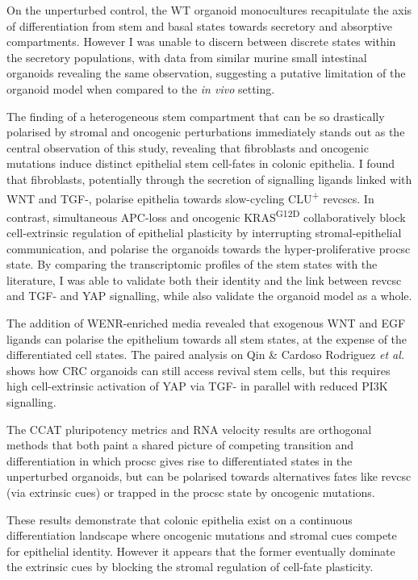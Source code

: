On the unperturbed control, the WT organoid monocultures recapitulate the axis of differentiation from stem and basal states towards secretory and absorptive compartments. However I was unable to discern between discrete states within the secretory populations, with data from similar murine small intestinal organoids revealing the same observation, suggesting a putative limitation of the organoid model when compared to the \emph{in vivo} setting.

The finding of a heterogeneous stem compartment that can be so drastically polarised by stromal and oncogenic perturbations immediately stands out as the central observation of this study, revealing that fibroblasts and oncogenic mutations induce distinct epithelial stem cell-fates in colonic epithelia. I found that fibroblasts, potentially through the secretion of signalling ligands linked with WNT and TGF-, polarise epithelia towards slow-cycling CLU\textsuperscript{+} \acrshort{revcsc}s. In contrast, simultaneous APC-loss and oncogenic KRAS\textsuperscript{G12D} collaboratively block cell-extrinsic regulation of epithelial plasticity by interrupting stromal-epithelial communication, and polarise the organoids towards the hyper-proliferative \acrshort{procsc} state. By comparing the transcriptomic profiles of the stem states with the literature, I was able to validate both their identity and the link between \acrshort{revcsc} and TGF- and YAP signalling, while also validate the organoid model as a whole.

The addition of WENR-enriched media revealed that exogenous WNT and EGF ligands can polarise the epithelium towards all stem states, at the expense of the differentiated cell states. The paired analysis on Qin \& Cardoso Rodriguez \emph{et al.}~\cite{cardoso_rodriguez_single-cell_2023} shows how CRC organoids can still access revival stem cells, but this requires high cell-extrinsic activation of YAP via TGF- in parallel with reduced PI3K signalling. 

The CCAT pluripotency metrics and RNA velocity results are orthogonal methods that both paint a shared picture of competing transition and differentiation in which \acrshort{procsc} gives rise to differentiated states in the unperturbed organoids, but can be polarised towards alternatives fates like \acrshort{revcsc} (via extrinsic cues) or trapped in the \acrshort{procsc} state by oncogenic mutations.

These results demonstrate that colonic epithelia exist on a continuous differentiation landscape where oncogenic mutations and stromal cues compete for epithelial identity. However it appears that the former eventually dominate the extrinsic cues by blocking the stromal regulation of cell-fate plasticity. 
